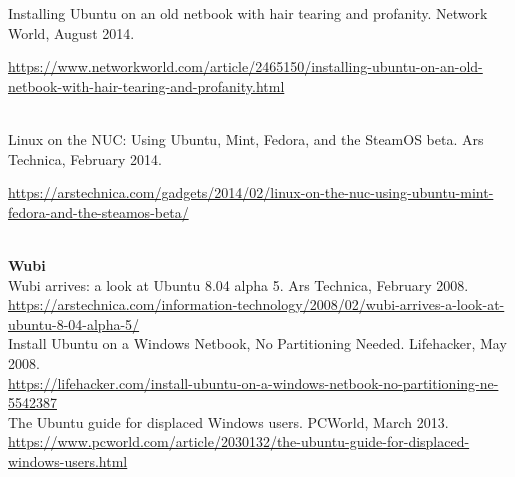 \documentclass[10pt,A4]{article}
\newcommand{\mystrut}{\rule[-.3\baselineskip]{0pt}{\baselineskip}}
\begin{document}
Installing Ubuntu on an old netbook with hair tearing and profanity. Network World, August 2014.\\
\begin{small}
\small{\url{https://www.networkworld.com/article/2465150/installing-ubuntu-on-an-old-netbook-with-hair-tearing-and-profanity.html}}
\end{small}\\

Linux on the NUC: Using Ubuntu, Mint, Fedora, and the SteamOS beta. Ars Technica, February 2014.\\
\begin{small}
\url{https://arstechnica.com/gadgets/2014/02/linux-on-the-nuc-using-ubuntu-mint-fedora-and-the-steamos-beta/}
\end{small}\\

\textbf{Wubi}\\

Wubi arrives: a look at Ubuntu 8.04 alpha 5. Ars Technica, February 2008.\\
\url{https://arstechnica.com/information-technology/2008/02/wubi-arrives-a-look-at-ubuntu-8-04-alpha-5/}\\

Install Ubuntu on a Windows Netbook, No Partitioning Needed. Lifehacker, May 2008.\\
\url{https://lifehacker.com/install-ubuntu-on-a-windows-netbook-no-partitioning-ne-5542387}\\

The Ubuntu guide for displaced Windows users. PCWorld, March 2013.\\
\url{https://www.pcworld.com/article/2030132/the-ubuntu-guide-for-displaced-windows-users.html}\\





%
%
%
%
%
%
\end{document}
